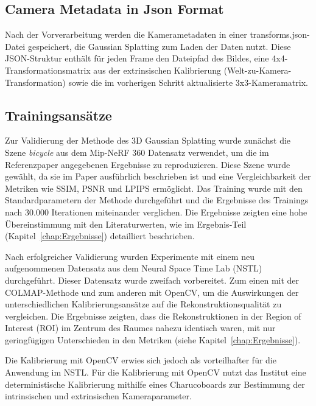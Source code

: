 \subsection{Camera Metadata in Json Format}
Nach der Vorverarbeitung werden die Kamerametadaten in einer transforms.json-Datei gespeichert, die Gaussian Splatting zum Laden der Daten nutzt. Diese JSON-Struktur enthält für jeden Frame den Dateipfad des Bildes, eine 4x4-Transformationsmatrix aus der extrinsischen Kalibrierung (Welt-zu-Kamera-Transformation) sowie die im vorherigen Schritt aktualisierte 3x3-Kameramatrix.

\subsection{Trainingsansätze}


Zur Validierung der Methode des 3D Gaussian Splatting wurde zunächst die Szene \textit{bicycle} aus dem Mip-NeRF 360 Datensatz \cite{barron2021mip} verwendet, um die im Referenzpaper \cite{kerbl3Dgaussians} angegebenen Ergebnisse zu reproduzieren. Diese Szene wurde gewählt, da sie im Paper ausführlich beschrieben ist und eine Vergleichbarkeit der Metriken wie SSIM, PSNR und LPIPS ermöglicht. Das Training wurde mit den Standardparametern der Methode durchgeführt und die Ergebnisse des Trainings nach 30.000 Iterationen miteinander verglichen.
Die Ergebnisse zeigten eine hohe Übereinstimmung mit den Literaturwerten, wie im Ergebnis-Teil (Kapitel~\ref{chap:Ergebnisse}) detailliert beschrieben.

Nach erfolgreicher Validierung wurden Experimente mit einem neu aufgenommenen Datensatz aus dem Neural Space Time Lab (NSTL) durchgeführt. Dieser Datensatz wurde zweifach vorbereitet.
Zum einen mit der COLMAP-Methode und zum anderen mit OpenCV, um die Auswirkungen der unterschiedlichen Kalibrierungsansätze auf die Rekonstruktionsqualität zu vergleichen. 
Die Ergebnisse zeigten, dass die Rekonstruktionen in der Region of Interest (ROI) im Zentrum des Raumes nahezu identisch waren, mit nur geringfügigen Unterschieden in den Metriken (siehe Kapitel~\ref{chap:Ergebnisse}).

Die Kalibrierung mit OpenCV erwies sich jedoch als vorteilhafter für die Anwendung im NSTL. 
Für die Kalibrierung mit OpenCV nutzt das Institut eine deterministische Kalibrierung mithilfe eines Charucoboards zur Bestimmung der intrinsischen und extrinsischen Kameraparameter.


